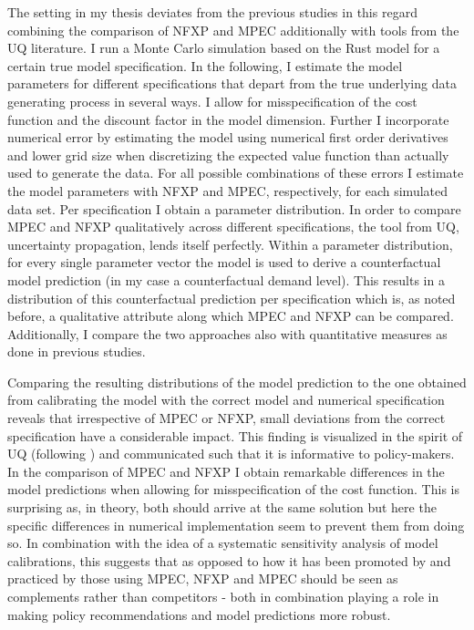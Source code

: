 The setting in my thesis deviates from the previous studies in this regard combining the comparison of NFXP and MPEC additionally with tools from the UQ literature. I run a Monte Carlo simulation based on the Rust model for a certain true model specification. In the following, I estimate the model parameters for different specifications that depart from the true underlying data generating process in several ways. I allow for misspecification of the cost function and the discount factor in the model dimension. Further I incorporate numerical error by estimating the model using numerical first order derivatives and lower grid size when discretizing the expected value function than actually used to generate the data. For all possible combinations of these errors I estimate the model parameters with NFXP and MPEC, respectively, for each simulated data set. Per specification I obtain a parameter distribution. In order to compare MPEC and NFXP qualitatively across different specifications, the tool from UQ, uncertainty propagation, lends itself perfectly. Within a parameter distribution, for every single parameter vector the model is used to derive a counterfactual model prediction (in my case a counterfactual demand level). This results in a distribution of this counterfactual prediction per specification which is, as noted before, a qualitative attribute along which MPEC and NFXP can be compared. Additionally, I compare the two approaches also with quantitative measures as done in previous studies.

Comparing the resulting distributions of the model prediction to the one obtained from calibrating the model with the correct model and numerical specification reveals that irrespective of MPEC or NFXP, small deviations from the correct specification have a considerable impact. This finding is visualized in the spirit of UQ (following \cite{Oberkampf.2010}) and communicated such that it is informative to policy-makers. In the comparison of MPEC and NFXP I obtain remarkable differences in the model predictions when allowing for misspecification of the cost function. This is surprising as, in theory, both should arrive at the same solution but here the specific differences in numerical implementation seem to prevent them from doing so. In combination with the idea of a systematic sensitivity analysis of model calibrations, this suggests that as opposed to how it has been promoted by \cite{Su.Judd.2012} and practiced by those using MPEC, NFXP and MPEC should be seen as complements rather than competitors - both in combination playing a role in making policy recommendations and model predictions more robust.

